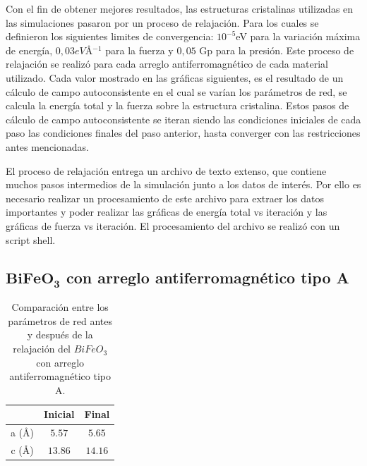 Con el fin de obtener mejores resultados, las estructuras cristalinas 
utilizadas en las simulaciones pasaron por un proceso de relajaci\'on. 
Para los cuales se definieron los siguientes limites de convergencia: 
$10^{-5}$eV para la variaci\'on m\'axima de energ\'ia, $0,03eV$\AA$^{-1}$ 
para la fuerza y $0,05$ Gp para la presi\'on. Este proceso de relajaci\'on se 
realiz\'o para cada arreglo antiferromagn\'etico de cada material utilizado. 
Cada valor mostrado en las gr\'aficas siguientes, es el resultado de un 
c\'alculo de campo autoconsistente en el cual se var\'ian los par\'ametros de 
red, se calcula la energ\'ia total y la fuerza sobre la estructura cristalina. 
Estos pasos de c\'alculo de campo autoconsistente se iteran siendo las 
condiciones iniciales de cada paso las condiciones finales del paso anterior, 
hasta converger con las restricciones antes mencionadas.

\noindent El proceso de relajaci\'on entrega un archivo de texto extenso, que 
contiene 
muchos pasos intermedios de la simulaci\'on junto a los datos de inter\'es. Por 
ello es necesario realizar un procesamiento de este archivo para extraer los 
datos importantes y poder realizar las gr\'aficas de energ\'ia total vs 
iteraci\'on y las gr\'aficas de fuerza vs iteraci\'on. El procesamiento del 
archivo se realiz\'o con un script shell.

\subsection{$\mathbf{BiFeO_{3}}$ con arreglo antiferromagn\'etico tipo A}

\begin{table}[H]
    \begin{center}
        \caption{Comparaci\'on entre los par\'ametros de red antes y despu\'es 
        de la relajaci\'on del $BiFeO_{3}$ con arreglo antiferromagn\'etico 
        tipo A.}
        \begin{tabular}{ccc}
            \hline
               & \textbf{Inicial} \cite{tomar2018} & \textbf{Final} \\
            \hline \hline
            a (\AA) & $5.57$  & $5.65$   \\
            \hline
            c (\AA) & $13.86$ & $14.16$   \\
            \hline
        \end{tabular}
        \singlespace
        \label{bfo_a_ini_fin}
    \end{center}
\end{table}

